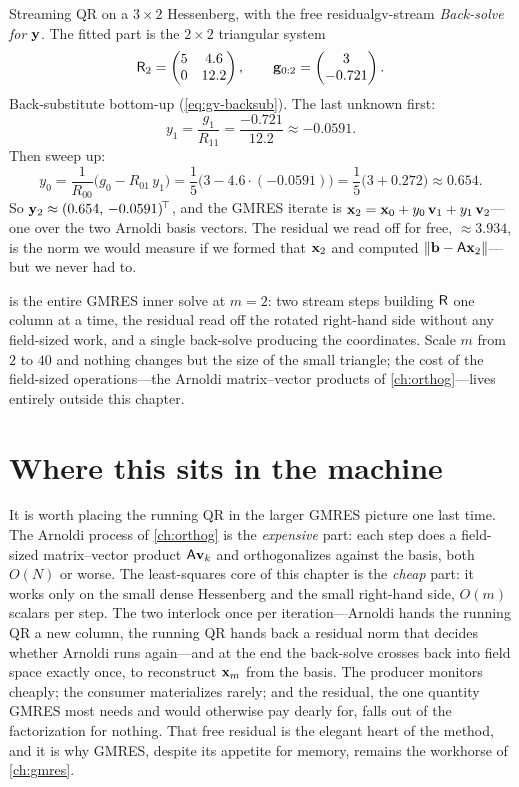 \begin{workedexample}{Streaming QR on a $3\times2$ Hessenberg, with the free residual}{gv-stream}
\medskip\emph{Back-solve for} $\mathbf{y}$. The fitted part is the $2\times2$ triangular system
\[
  \mathsf{R}_2 = \begin{pmatrix} 5 & 4.6 \\ 0 & 12.2 \end{pmatrix},
  \qquad \mathbf{g}_{0:2} = \begin{pmatrix} 3 \\ -0.721 \end{pmatrix}.
\]
Back-substitute bottom-up (\cref{eq:gv-backsub}). The last unknown first:
\[
  y_1 = \frac{g_1}{R_{11}} = \frac{-0.721}{12.2} \approx -0.0591.
\]
Then sweep up:
\[
  y_0 = \frac{1}{R_{00}}\big(g_0 - R_{01}\,y_1\big)
      = \frac{1}{5}\big(3 - 4.6\cdot(-0.0591)\big)
      = \frac{1}{5}\big(3 + 0.272\big) \approx 0.654.
\]
So $\mathbf{y}_2 \approx (0.654,\,-0.0591)^{\!\top}$, and the GMRES iterate is $\mathbf{x}_2 = \mathbf{x}_0 +
y_0\,\mathbf{v}_1 + y_1\,\mathbf{v}_2$---one  over the two Arnoldi basis
vectors. The residual we read off for free, $\approx 3.934$, is the norm we would
measure if we formed that $\mathbf{x}_2$ and computed $\lVert\mathbf{b} - \mathsf{A}\mathbf{x}_2\rVert$---but we never
had to.
\end{workedexample}

 is the entire GMRES inner solve at $m=2$: two stream steps building
$\mathsf{R}$ one column at a time, the residual read off the rotated right-hand side without
any field-sized work, and a single back-solve producing the coordinates. Scale $m$ from
$2$ to $40$ and nothing changes but the size of the small triangle; the cost of the
field-sized operations---the Arnoldi matrix--vector products of \cref{ch:orthog}---lives
entirely outside this chapter.

\section{Where this sits in the machine}
\label{sec:gv-context}

It is worth placing the running QR in the larger GMRES picture one last time. The Arnoldi
process of \cref{ch:orthog} is the \emph{expensive} part: each step does a field-sized
matrix--vector product $\mathsf{A}\mathbf{v}_k$ and orthogonalizes against the basis, both $O(N)$ or
worse. The least-squares core of this chapter is the \emph{cheap} part: it works only on
the small dense Hessenberg and the small right-hand side, $O(m)$ scalars per step. The two
interlock once per iteration---Arnoldi hands the running QR a new column, the running QR
hands back a residual norm that decides whether Arnoldi runs again---and at the end the
back-solve crosses back into field space exactly once, to reconstruct $\mathbf{x}_m$ from the
basis. The producer monitors cheaply; the consumer materializes rarely; and the residual,
the one quantity GMRES most needs and would otherwise pay dearly for, falls out of the
factorization for nothing. That free residual is the elegant heart of the method, and it
is why GMRES, despite its appetite for memory, remains the workhorse of \cref{ch:gmres}.

